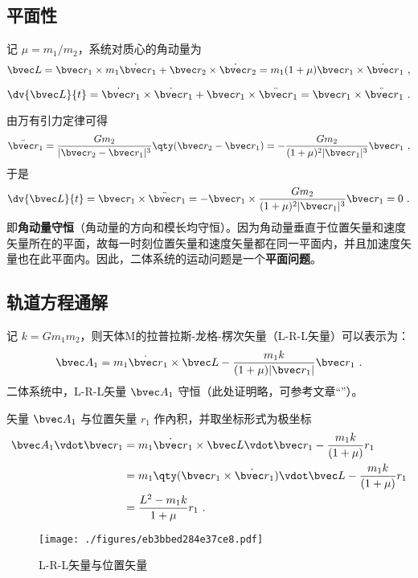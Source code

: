 \subsection{平面性}
 记 $\mu=m_1/m_2$，系统对质心的角动量为
\begin{equation}
\bvec L =\bvec r_1 \times m_1 \dot{\bvec r}_1+ \bvec r_2 \times \dot{\bvec r}_2 = m_1 (1+\mu)\bvec r_1 \times \dot{\bvec r}_1~,
\end{equation}

\begin{equation}
\dv{\bvec L}{t} = \dot{\bvec r}_1 \times \dot{\bvec r}_1 + \bvec r_1 \times \ddot{\bvec r}_1=\bvec r_1 \times \ddot{\bvec r}_1~.
\end{equation}

由万有引力定律可得
\begin{equation}\label{eq_ConDB_4}
\ddot{\bvec r}_1 = \frac{Gm_2}{|\bvec r_2 - \bvec r_1|^3} \qty(\bvec r_2 - \bvec r_1) = - \frac{Gm_2}{(1+\mu)^2|\bvec r_1|^3}\bvec r_1~,
\end{equation}
于是
\begin{equation}
\dv{\bvec L}{t} =\bvec r_1 \times \ddot{\bvec r}_1= -\bvec r_1 \times \frac{Gm_2}{(1+\mu)^2|\bvec r_1|^3}\bvec r_1= 0~.
\end{equation}
即\textbf{角动量守恒}（角动量的方向和模长均守恒）。因为角动量垂直于位置矢量和速度矢量所在的平面，故每一时刻位置矢量和速度矢量都在同一平面内，并且加速度矢量也在此平面内。因此，二体系统的运动问题是一个\textbf{平面问题}。

\subsection{轨道方程通解}
记 $k=Gm_1m_2$，则天体M的拉普拉斯-龙格-楞次矢量（L-R-L矢量）可以表示为：
\begin{equation}
\bvec A_1 = m_1\dot{\bvec r}_1 \times \bvec L - \frac{m_1k}{(1+\mu)|\bvec r_1|}\bvec r_1~.
\end{equation}
二体系统中，L-R-L矢量 $\bvec A_1$ 守恒（此处证明略，可参考文章“”）。

矢量 $\bvec A_1$ 与位置矢量 $r_1$ 作內积，并取坐标形式为极坐标
\begin{equation}\label{eq_ConDB_7}
\begin{aligned}
\bvec A_1 \vdot \bvec r_1 &= m_1\dot{\bvec r}_1 \times \bvec L \vdot \bvec r_1 - \frac{m_1k}{(1+\mu)}r_1\\
&= m_1\qty(\bvec r_1 \times \dot{\bvec r}_1)\vdot \bvec L - \frac{m_1k}{(1+\mu)}r_1 \\
&= \frac{L^2-m_1k}{1+\mu}r_1~.
\end{aligned}
\end{equation}
\begin{figure}[ht]
\centering
\texttt{[image: ./figures/eb3bbed284e37ce8.pdf]}
\caption{L-R-L矢量与位置矢量} \label{fig_ConDB_1}
\end{figure}

